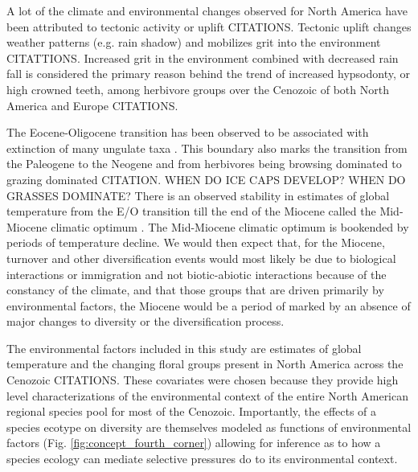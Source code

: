 \documentclass[12pt,letterpaper]{article}
\begin{document}
A lot of the climate and environmental changes observed for North America have been attributed to tectonic activity or uplift \citep{Blois2009,Eronen2015,Janis2008a,Badgley2013} CITATIONS. Tectonic uplift changes weather patterns (e.g. rain shadow) and mobilizes grit into the environment CITATTIONS. Increased grit in the environment combined with decreased rain fall is considered the primary reason behind the trend of increased hypsodonty, or high crowned teeth, among herbivore groups over the Cenozoic of both North America and Europe CITATIONS.

The Eocene-Oligocene transition has been observed to be associated with extinction of many ungulate taxa \citep{Janis2008a}. This boundary also marks the transition from the Paleogene to the Neogene and from herbivores being browsing dominated to grazing dominated CITATION. \uppercase{when do ice caps develop? when do grasses dominate?} There is an observed stability in estimates of global temperature from the E/O transition till the end of the Miocene called the Mid-Miocene climatic optimum \citep{Zachos2001,Zachos2008}. The Mid-Miocene climatic optimum is bookended by periods of temperature decline. We would then expect that, for the Miocene, turnover and other diversification events would most likely be due to biological interactions or immigration and not biotic-abiotic interactions because of the constancy of the climate, and that those groups that are driven primarily by environmental factors, the Miocene would be a period of marked by an absence of major changes to diversity or the diversification process.

The environmental factors included in this study are estimates of global temperature and the changing floral groups present in North America across the Cenozoic CITATIONS. These covariates were chosen because they provide high level characterizations of the environmental context of the entire North American regional species pool for most of the Cenozoic. Importantly, the effects of a species ecotype on diversity are themselves modeled as functions of environmental factors (Fig. \ref{fig:concept_fourth_corner}) allowing for inference as to how a species ecology can mediate selective pressures do to its environmental context. 
\end{document}
